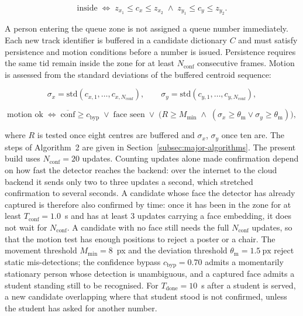 \begin{equation}
\text{inside} \;\Longleftrightarrow\; z_{x_1} \leq c_x \leq z_{x_2}
\;\wedge\; z_{y_1} \leq c_y \leq z_{y_2}.
\label{eq:zone}
\end{equation}

\noindent A person entering the queue zone is not assigned a queue
number immediately. Each new track identifier is buffered in a
candidate dictionary $C$ and must satisfy persistence and motion
conditions before a number is issued. Persistence requires the same
$\mathrm{tid}$ remain inside the zone for at least $N_{\mathrm{conf}}$
consecutive frames. Motion is assessed from the standard deviations
of the buffered centroid sequence:

\begin{equation}
\sigma_x = \mathrm{std}(c_{x,1},\ldots,c_{x,N_{\mathrm{conf}}}),
\qquad
\sigma_y = \mathrm{std}(c_{y,1},\ldots,c_{y,N_{\mathrm{conf}}}),
\label{eq:sigma}
\end{equation}

\begin{equation}
\text{motion ok} \;\Longleftrightarrow\;
\overline{\text{conf}} \geq c_{\mathrm{byp}}
\;\vee\; \text{face seen}
\;\vee\; \big(R \geq M_{\min} \;\wedge\;
(\sigma_x \geq \theta_{\mathrm{m}} \vee \sigma_y \geq \theta_{\mathrm{m}})\big),
\label{eq:motion-gate}
\end{equation}


\noindent where $R$ is tested once eight centres are buffered and
$\sigma_x$, $\sigma_y$ once ten are. The steps of Algorithm~2 are given
in Section~\ref{subsec:major-algorithms}. The present build uses
$N_{\mathrm{conf}} = 20$ updates. Counting updates alone made
confirmation depend on how fast the detector reaches the backend: over
the internet to the cloud backend it sends only two to three updates a
second, which stretched confirmation to several seconds. A candidate
whose face the detector has already captured is therefore also
confirmed by time: once it has been in the zone for at least
$T_{\mathrm{conf}} = 1.0$~s and has at least $3$ updates carrying a face
embedding, it does not wait for $N_{\mathrm{conf}}$. A candidate with no
face still needs the full $N_{\mathrm{conf}}$ updates, so that the motion
test has enough positions to reject a poster or a chair. The movement
threshold $M_{\min} = 8$~px and the deviation threshold
$\theta_{\mathrm{m}} = 1.5\ \mathrm{px}$ reject static mis-detections;
the confidence bypass $c_{\mathrm{byp}} = 0.70$ admits a momentarily
stationary person whose detection is unambiguous, and a captured face
admits a student standing still to be recognised. For
$T_{\mathrm{done}} = 10$~s after a student is served, a new candidate
overlapping where that student stood is not confirmed, unless the
student has asked for another number.

